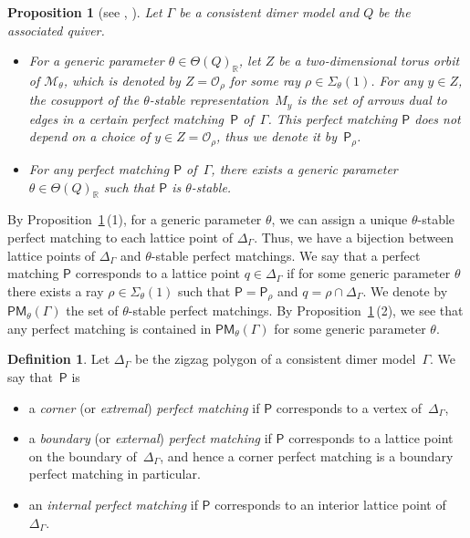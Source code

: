 \documentclass[pdftex]{sigma}
\numberwithin{equation}{section}
\newtheorem{Proposition}[Theorem]{Proposition}
\theoremstyle{definition}
\newtheorem{Definition}[Theorem]{Definition}
\newcommand{\RR}{\mathbb{R}}
\newcommand{\calM}{\mathcal{M}}
\newcommand{\calO}{\mathcal{O}}
\newcommand{\sfP}{\mathsf{P}}
\newcommand{\PM}{\mathsf{PM}}
\begin{document}
\begin{Proposition}[{see \cite[Section~6]{IU_moduli}, \cite[Proposition~4.15]{Moz}}]
\label{corresp_pm}
Let $\Gamma$ be a consistent dimer model and $Q$ be the associated quiver.
\begin{itemize}\itemsep=0pt
\item[$(1)$] For a generic parameter $\theta\in\Theta(Q)_\RR$,
let $Z$ be a two-dimensional torus orbit of $\calM_\theta$, which is denoted by $Z=\calO_\rho$ for some ray $\rho\in\Sigma_\theta(1)$.
For any $y\in Z$, the cosupport of the $\theta$-stable representation~$M_y$ is the set of arrows dual to edges in
a certain perfect matching~$\sfP$ of~$\Gamma$.
This perfect matching $\sfP$ does not depend on a choice of $y\in Z=\calO_\rho$, thus we denote it by~$\sfP_\rho$.
\item[$(2)$]
For any perfect matching $\sfP$ of~$\Gamma$, there exists a generic parameter $\theta\in\Theta(Q)_\RR$ such that $\sfP$ is $\theta$-stable.
\end{itemize}
\end{Proposition}

By Proposition~\ref{corresp_pm}\,(1), for a generic parameter $\theta$,
we can assign a unique $\theta$-stable perfect matching to each lattice point of $\Delta_\Gamma$.
Thus, we have a bijection between lattice points of $\Delta_\Gamma$ and $\theta$-stable perfect matchings.
We say that a perfect matching $\sfP$ corresponds to a lattice point $q\in\Delta_\Gamma$
if for some generic parameter $\theta$ there exists a ray $\rho\in\Sigma_\theta(1)$ such that $\sfP=\sfP_\rho$ and $q=\rho\cap \Delta_\Gamma$.
We denote by $\PM_\theta(\Gamma)$ the set of $\theta$-stable perfect matchings.
By Proposition~\ref{corresp_pm}\,(2), we see that any perfect matching is contained in $\PM_\theta(\Gamma)$ for some generic parameter $\theta$.

\begin{Definition}
Let $\Delta_\Gamma$ be the zigzag polygon of a consistent dimer model~$\Gamma$.
We say that~$\sfP$ is
\begin{itemize}\itemsep=0pt
\item a \emph{corner} (or \emph{extremal}) \emph{perfect matching} if $\sfP$ corresponds to a vertex of~$\Delta_\Gamma$,
\item a \emph{boundary} (or \emph{external}) \emph{perfect matching} if $\sfP$ corresponds to a lattice point on the boundary of~$\Delta_\Gamma$,
and hence a corner perfect matching is a boundary perfect matching in particular.
\item an \emph{internal} \emph{perfect matching} if $\sfP$ corresponds to an interior lattice point of~$\Delta_\Gamma$.
\end{itemize}
\end{Definition}
\end{document}
